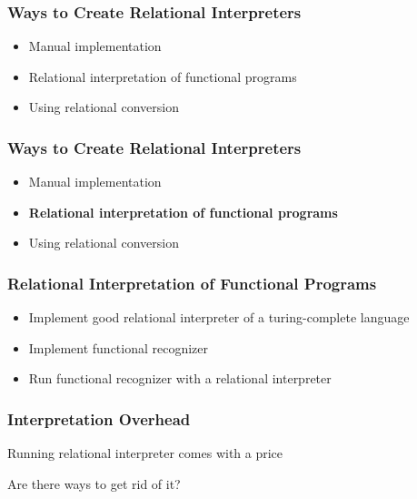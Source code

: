 \documentclass[xcolor=table]{beamer}
\begin{document}
\begin{frame}[fragile]
  \transwipe[direction=90]
  \frametitle{Ways to Create Relational Interpreters}
\begin{itemize}
	\item Manual implementation
	\item Relational interpretation of functional programs
	\item Using relational conversion 
\end{itemize}
\end{frame}

\begin{frame}[fragile]
  \transwipe[direction=90]
  \frametitle{Ways to Create Relational Interpreters}
\begin{itemize}
	\item Manual implementation
	\item \textbf{Relational interpretation of functional programs}
	\item Using relational conversion 
\end{itemize} 

\end{frame}

\begin{frame}[fragile]
  \transwipe[direction=90]
  \frametitle{Relational Interpretation of Functional Programs}
\begin{itemize}
	\item Implement good relational interpreter of a turing-complete language
	\item Implement functional recognizer
	\item Run functional recognizer with a relational interpreter 
\end{itemize}
\end{frame}


\begin{frame}[fragile]
  \transwipe[direction=90]
  \frametitle{Interpretation Overhead}
\begin{center} 
Running relational interpreter comes with a price 
\end{center} 


\begin{center} 
Are there ways to get rid of it? 
\end{center} 

\end{frame}
\end{document}
